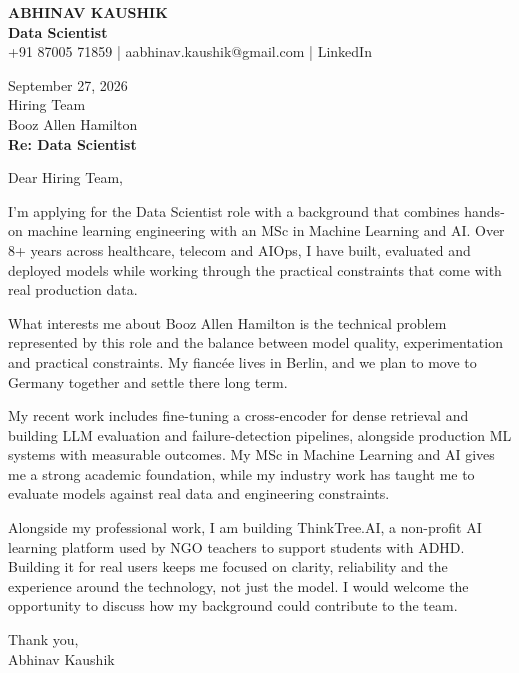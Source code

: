 \documentclass[10pt,a4paper]{article}
\begin{document}
\begin{center}
{\Large\bfseries ABHINAV KAUSHIK}\\[2pt]
{\bfseries Data Scientist}\\[2pt]
+91 87005 71859 \quad | \quad aabhinav.kaushik@gmail.com \quad | \quad LinkedIn
\end{center}
\vspace{8pt}
September 27, 2026\\[6pt]
Hiring Team\\
Booz Allen Hamilton\\[4pt]
\textbf{Re: Data Scientist}

Dear Hiring Team,

I’m applying for the Data Scientist role with a background that combines hands-on machine learning engineering with an MSc in Machine Learning and AI. Over 8+ years across healthcare, telecom and AIOps, I have built, evaluated and deployed models while working through the practical constraints that come with real production data.

What interests me about Booz Allen Hamilton is the technical problem represented by this role and the balance between model quality, experimentation and practical constraints. My fiancée lives in Berlin, and we plan to move to Germany together and settle there long term.

My recent work includes fine-tuning a cross-encoder for dense retrieval and building LLM evaluation and failure-detection pipelines, alongside production ML systems with measurable outcomes. My MSc in Machine Learning and AI gives me a strong academic foundation, while my industry work has taught me to evaluate models against real data and engineering constraints.

Alongside my professional work, I am building ThinkTree.AI, a non-profit AI learning platform used by NGO teachers to support students with ADHD. Building it for real users keeps me focused on clarity, reliability and the experience around the technology, not just the model. I would welcome the opportunity to discuss how my background could contribute to the team.

Thank you,\\
Abhinav Kaushik
\end{document}
